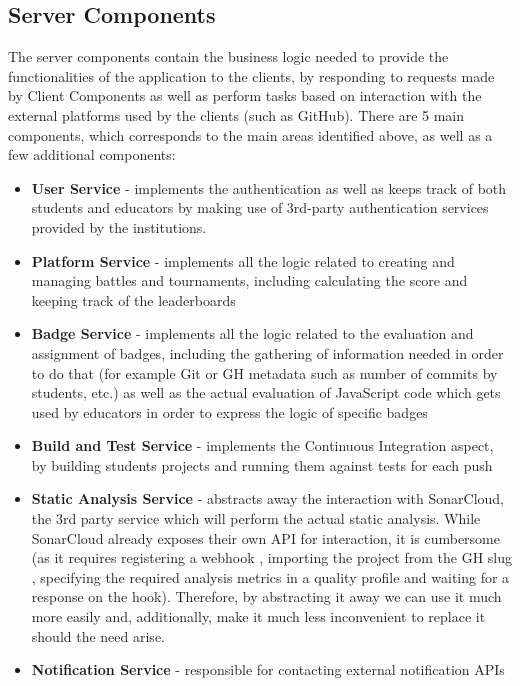 \subsection{Server Components}
The server components contain the business logic needed to provide the functionalities of the application to the clients,
by responding to requests made by Client Components as well as perform tasks based on interaction with the external
platforms used by the clients (such as GitHub). There are 5 main components, which corresponds to the main areas identified
above, as well as a few additional components:
\begin{itemize}
    \item \textbf{User Service} {-} implements the authentication as well as keeps track of both students and educators by making
          use of 3rd-party authentication services provided by the institutions.
    \item \textbf{Platform Service} {-} implements all the logic related to creating and managing battles and tournaments, including
          calculating the score and keeping track of the leaderboards
    \item \textbf{Badge Service} {-} implements all the logic related to the evaluation and assignment of badges, including the gathering
          of information needed in order to do that (for example Git or GH metadata such as number of commits by students, etc.)
          as well as the actual evaluation of JavaScript code which gets used by educators in order to express the logic of
          specific badges
    \item \textbf{Build and Test Service} {-} implements the Continuous Integration aspect, by building students projects and
          running them against tests for each push
    \item \textbf{Static Analysis Service} {-} abstracts away the interaction with SonarCloud, the 3rd party service which will
          perform the actual static analysis. While SonarCloud already exposes their own API for interaction, it is cumbersome
          (as it requires registering a webhook \cite{SonarCloudWh}, importing the project from the GH slug \cite{SonarCloudGh},
          specifying the required analysis metrics in a quality profile \cite{SonarCloudQp} and waiting for a response on the hook).
          Therefore, by abstracting it away we can use it much more easily and, additionally, make it much less inconvenient to
          replace it should the need arise.
    \item \textbf{Notification Service} {-} responsible for contacting external notification APIs

\end{itemize}
